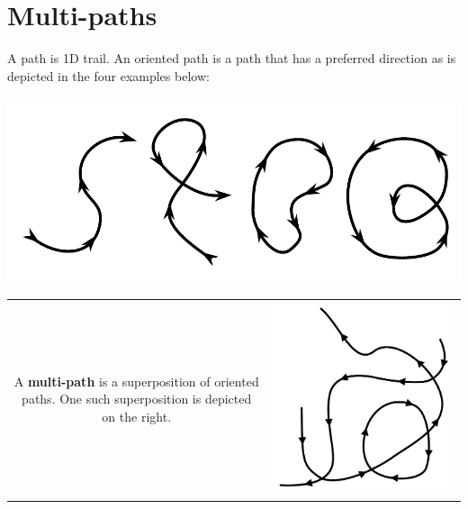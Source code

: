 \documentclass{book}
\begin{document}
\section{Multi-paths}

A path is 1D trail. An oriented path is a path that has a preferred direction as is depicted in the four examples below:
\begin{center}
\includegraphics[scale = 0.5]{Multi-structures/Multipaths/oriented_paths}
\end{center}

\begin{tabular}{cc}
\parbox{0.5\textwidth}{
A \textbf{multi-path} is a superposition of oriented paths. One such superposition is depicted on the right.
} & \parbox{0.5\textwidth}{
\includegraphics[scale = 0.7]{Multi-structures/Multipaths/multi-path_simple}
}
\end{tabular}
\end{document}
